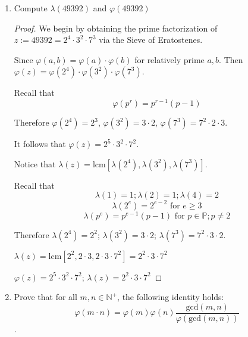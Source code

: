 \documentclass[12pt]{article}
\begin{document}
\begin{enumerate}
\begin{proof}
       At last we find a solution for $286 \cdot x_3 \underset{\textrm{mod }7}{\equiv} 5$ which is equivalent to finding a solution for $6 \cdot x_3 \underset{\textrm{mod }7}{\equiv} 5$ which in turn is equivalent to $-1 \cdot x_3 \underset{\textrm{mod }7}{\equiv} -2$. Therefore $x_3=2$ is a solution.
       
       We proceed to build the global solution by considering $7\cdot 22 \cdot -2 + 13 \cdot 7 \cdot -1 + 13 \cdot 22 \cdot 2 = 173$
    \end{proof}
    
    In the next three exercises $\lambda$ will denote the Carmichael function and $\varphi$ Euler's totient function.
    
    \item Compute $\lambda(49392)$ and $\varphi(49392)$
    
    \begin{proof}
        We begin by obtaining the prime factorization of $z := 49392 = 2^4 \cdot 3^2 \cdot 7^3 $ via the Sieve of Eratostenes.
        
        Since $\varphi (a,b) = \varphi(a) \cdot \varphi(b)$ for relatively prime $a,b$. Then $\varphi(z) = \varphi(2^4) \cdot \varphi (3^2) \cdot \varphi(7^3)$.
        
        Recall that 
        $$ \varphi(p^r) = p^{r-1}(p-1) $$
        
        Therefore $\varphi(2^4) = 2^3 $, $\varphi(3^2) = 3 \cdot 2$, $\varphi (7^3) = 7^2 \cdot 2 \cdot 3$.
        
        It follows that $\varphi(z) = 2^5 \cdot 3^2 \cdot 7^2 $.
        
        Notice that $\lambda(z) = \textrm{lcm}[\lambda(2^4), \lambda(3^2), \lambda(7^3)]$.
        
        Recall that $$\lambda (1) = 1; \lambda(2) = 1; \lambda(4) = 2$$  $$ \lambda (2^e) = 2^{e-2} \textrm{ for } e \geq 3$$  $$ \lambda(p^e)= p^{e-1}(p-1) \textrm{ for } p \in \mathbb P; p \neq 2$$
        
        Therefore $\lambda(2^4) = 2^2 $; $\lambda(3^2)= 3 \cdot 2$; $\lambda(7^3) = 7^2 \cdot 3 \cdot 2$.
        
        $\lambda(z) = \textrm{lcm}[2^2, 2 \cdot 3, 2 \cdot 3 \cdot 7^2] = 2^2 \cdot 3 \cdot 7^2$
        
        $\varphi(z) = 2^5 \cdot 3^2 \cdot 7^2 $; $\lambda(z) = 2^2 \cdot 3 \cdot 7^2$
    \end{proof}
    
    \item Prove that for all $m,n \in \mathbb N ^+$, the following identity holds:
    $$ \varphi(m \cdot n)= \varphi(m) \varphi(n)\displaystyle\frac{\textrm{gcd}(m,n)}{\varphi(\textrm{gcd}(m,n))}$$.
    

\end{enumerate}
\end{document}
